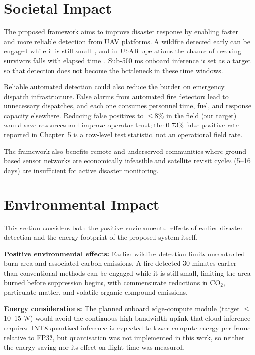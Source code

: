 \section{Societal Impact}

The proposed framework aims to improve disaster response by enabling faster and more reliable detection from UAV platforms. A wildfire detected early can be engaged while it is still small~\cite{merino2012unmanned}, and in USAR operations the chance of rescuing survivors falls with elapsed time~\cite{erdelj2017help}. Sub-500 ms onboard inference is set as a target so that detection does not become the bottleneck in these time windows.

Reliable automated detection could also reduce the burden on emergency dispatch infrastructure. False alarms from automated fire detectors lead to unnecessary dispatches, and each one consumes personnel time, fuel, and response capacity elsewhere. Reducing false positives to $\leq$8\% in the field (our target) would save resources and improve operator trust; the 0.73\% false-positive rate reported in Chapter~5 is a row-level test statistic, not an operational field rate.

The framework also benefits remote and underserved communities where ground-based sensor networks are economically infeasible and satellite revisit cycles (5--16 days) are insufficient for active disaster monitoring.

\section{Environmental Impact}

This section considers both the positive environmental effects of earlier disaster detection and the energy footprint of the proposed system itself.

\textbf{Positive environmental effects:} Earlier wildfire detection limits uncontrolled burn area and associated carbon emissions. A fire detected 30 minutes earlier than conventional methods can be engaged while it is still small, limiting the area burned before suppression begins, with commensurate reductions in CO$_2$, particulate matter, and volatile organic compound emissions.

\textbf{Energy considerations:} The planned onboard edge-compute module (target $\leq$10--15 W) would avoid the continuous high-bandwidth uplink that cloud inference requires. INT8 quantised inference is expected to lower compute energy per frame relative to FP32, but quantisation was not implemented in this work, so neither the energy saving nor its effect on flight time was measured.

